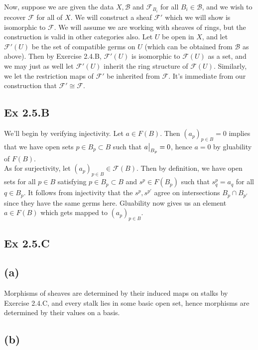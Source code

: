 \documentclass{article}
\newcommand\restr[2]{{%
  \left.\kern-\nulldelimiterspace %
  #1 %
  \vphantom{\big|} %
  \right|_{#2} %
  }}
\theoremstyle{definition}
\begin{document}
Now, suppose we are given the data $X, \mathcal{B}$ and $\mathcal{F}_{B_i}$ for
all $B_i \in \mathcal{B}$, and we wish to recover $\mathcal{F}$ for all of $X$.
We will construct a sheaf $\mathcal{F}'$ which we will show is isomorphic to
$\mathcal{F}$. We will assume we are working with sheaves of rings, but the
construction is valid in other categories also. Let $U$ be open in $X$, and let
$\mathcal{F}'(U)$ be the set of compatible germs on $U$ (which can be obtained
from $\mathcal{B}$ as above). Then by Exercise 2.4.B, $\mathcal{F}'(U)$ is
isomorphic to $\mathcal{F}(U)$ as a set, and we may just as well let
$\mathcal{F}'(U)$ inherit the ring structure of $\mathcal{F}(U)$. Similarly, we
let the restriction maps of $\mathcal{F}'$ be inherited from $\mathcal{F}$.
It's immediate from our construction that $\mathcal{F}' \cong \mathcal{F}$.

\subsection*{Ex 2.5.B}

We'll begin by verifying injectivity. Let $a \in F(B)$. Then $(a_p)_{p \in B} =
0$ implies that we have open sets $p \in B_p \subset B$ such that
$\restr{a}{B_p} = 0$, hence $a = 0$ by gluability of $F(B)$. \\

As for surjectivity, let $(a_p)_{p \in B} \in \mathcal{F}(B)$. Then by
definition, we have open sets for all $p \in B$ satisfying $p \in B_p \subset
B$ and $s^p \in F(B_p)$ such that $s^p_q = a_q$ for all $q \in B_p$. It follows
from injectivity that the $s^p, s^{p'}$ agree on intersections $B_p \cap
B_{p'}$ since they have the same germs here. Gluability now gives us an element
$a \in F(B)$ which gets mapped to $(a_p)_{p \in B}$.

\subsection*{Ex 2.5.C}

\subsection*{(a)}

Morphisms of sheaves are determined by their induced maps on stalks by Exercise
2.4.C, and every stalk lies in some basic open set, hence morphisms are
determined by their values on a basis.

\subsection*{(b)}
\end{document}
